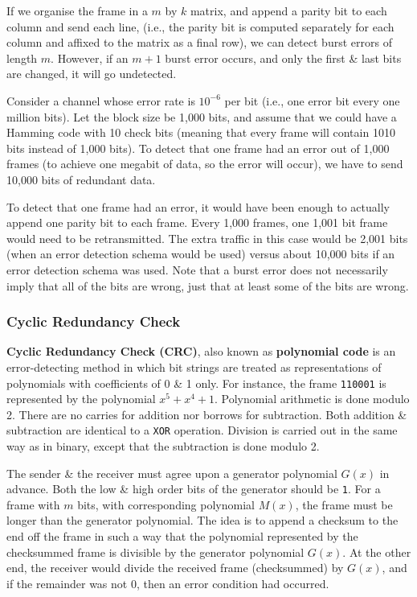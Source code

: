\documentclass[11pt]{article}
\begin{document}
If we organise the frame in a $m$ by $k$ matrix, and append a parity bit to each column and send each line, (i.e., the parity 
bit is computed separately for each column and affixed to the matrix as a final row), we can detect burst errors of 
length $m$. 
However, if an $m+1$ burst error occurs, and only the first \& last bits are changed, it will go undetected.

Consider a channel whose error rate is $10^{-6}$ per bit (i.e., one error bit every one million bits). 
Let the block size be 1,000 bits, and assume that we could have a Hamming code with 10 check bits (meaning that every
frame will contain 1010 bits instead of 1,000 bits). 
To detect that one frame had an error out of 1,000 frames (to achieve one megabit of data, so the error will occur), we 
have to send 10,000 bits of redundant data.

To detect that one frame had an error, it would have been enough to actually append one parity bit to each frame. 
Every 1,000 frames, one 1,001 bit frame would need to be retransmitted. 
The extra traffic in this case would be 2,001 bits (when an error detection schema would be used) versus about 10,000 
bits if an error detection schema was used.
Note that a burst error does not necessarily imply that all of the bits are wrong, just that at least some of the bits 
are wrong.

\subsubsection{Cyclic Redundancy Check}
\textbf{Cyclic Redundancy Check (CRC)}, also known as \textbf{polynomial code} is an error-detecting method in which 
bit strings are treated as representations of polynomials with coefficients of 0 \& 1 only. 
For instance, the frame \verb|110001| is represented by the polynomial $x^5+x^4+1$. 
Polynomial arithmetic is done modulo 2. 
There are no carries for addition nor borrows for subtraction. 
Both addition \& subtraction are identical to a \verb|XOR| operation.
Division is carried out in the same way as in binary, except that the subtraction is done modulo 2.

The sender \& the receiver must agree upon a generator polynomial $G(x)$ in advance. Both the low \& high order bits of 
the generator should be \verb|1|. 
For a frame with $m$ bits, with corresponding polynomial $M(x)$, the frame must be longer than the generator polynomial. 
The idea is to append a checksum to the end off the frame in such a way that the polynomial represented by the checksummed 
frame is divisible by the generator polynomial $G(x)$.
At the other end, the receiver would divide the received frame (checksummed) by $G(x)$, and if the remainder was not 0, 
then an error condition had occurred.
\end{document}
